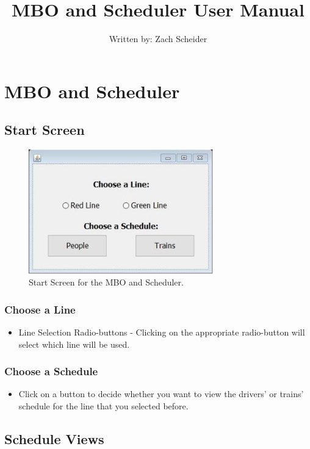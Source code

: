 \documentclass[letterpaper]{article}
\begin{document}
\title{MBO and Scheduler User Manual}
\author{Written by: Zach Scheider}
\date{}

\maketitle


\section{MBO and Scheduler}

\subsection{Start Screen}

\begin{figure}[h!]
	\center
	\includegraphics[width=8cm]{main_screen}
	\caption{Start Screen for the MBO and Scheduler.}
\end{figure}


	\subsubsection{Choose a Line}
		\begin{itemize}
			\item Line Selection Radio-buttons - Clicking on the appropriate radio-button will select which line will be used.
		\end{itemize}
	\subsubsection{Choose a Schedule}
		\begin{itemize}
			\item Click on a button to decide whether you want to view the drivers' or trains' schedule for the line that you selected before.
		\end{itemize}
	
\subsection{Schedule Views}
\end{document}

